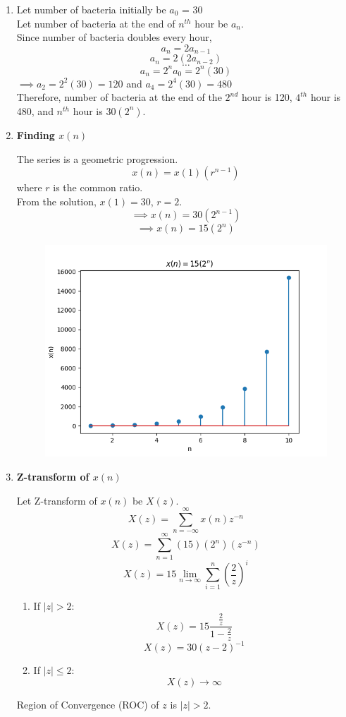 \documentclass[journal,12pt,twocolumn]{IEEEtran}
\theoremstyle{remark}
\begin{document}
\begin{enumerate}
\item
Let number of bacteria initially be $a_0$ = 30
\\
Let number of bacteria at the end of $n^{th}$ hour be $a_n$.
\\
Since number of bacteria doubles every hour, \[a_n = 2a_{n - 1}\]
\[a_n = 2(2a_{n - 2})\]
\[\dots\]
\[a_n = 2^na_0 = 2^n(30)\]
$\implies a_2 = 2^2(30) = 120$ and $a_4 = 2^4(30) = 480$
\\

Therefore, number of bacteria at the end of the $2^{nd}$ hour is 120, $4^{th}$ hour is 480, and $n^{th}$ hour is $30(2^n)$.

\item \textbf{Finding $x(n)$}

The series is a geometric progression.
\[x(n) = x(1) (r^{n-1})\]
where $r$ is the common ratio.\\
From the solution, $x(1) = 30$, $r = 2$.
\[\implies x(n) = 30(2^{n-1})\]
\[\implies x(n) = 15(2^n)\]

\begin{figure}[h!]
    \centering
    \includegraphics[width=\columnwidth]{plots/11_9_3_30.png}
\end{figure}


\item \textbf{Z-transform of $x(n)$}

Let Z-transform of $x(n)$ be $X(z)$.
\[X(z) = \sum_{n = -\infty}^{\infty} x(n)z^{-n}\]
\[X(z) = \sum_{n = 1}^{\infty} (15)(2^n)(z^{-n})\]
\[X(z) = 15\lim_{n\to\infty}\sum_{i = 1}^{n}(\frac{2}{z})^i\]

\begin{enumerate}
\item If $|z| > 2$:
\[X(z) = 15\frac{\frac{2}{z}}{1 - \frac{2}{z}}\]
\[X(z) = 30(z - 2)^{-1}\]

\item If $|z| \le 2$:
\[X(z) \to \infty\]

\end{enumerate}

Region of Convergence (ROC) of $z$ is $|z| > 2$.

\end{enumerate}
\end{document}
